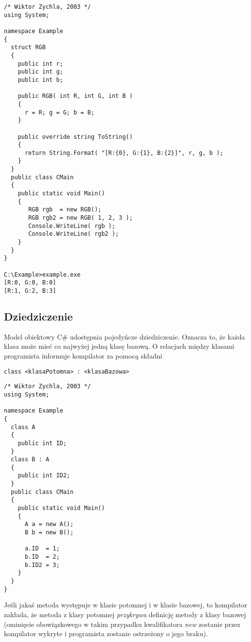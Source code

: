\begin{scriptsize}
\begin{verbatim}
/* Wiktor Zychla, 2003 */
using System;

namespace Example
{
  struct RGB
  {
    public int r;
    public int g;
    public int b;
    
    public RGB( int R, int G, int B )
    {
      r = R; g = G; b = B;
    }

    public override string ToString()
    {
      return String.Format( "[R:{0}, G:{1}, B:{2}]", r, g, b );
    }
  }
  public class CMain
  {    
    public static void Main()
    {
       RGB rgb  = new RGB(); 
       RGB rgb2 = new RGB( 1, 2, 3 );
       Console.WriteLine( rgb );
       Console.WriteLine( rgb2 );
    }
  }
}

C:\Example>example.exe
[R:0, G:0, B:0]
[R:1, G:2, B:3]
\end{verbatim}
\end{scriptsize}

\subsection{Dziedziczenie}

Model obiektowy C\# udostępnia pojedyńcze dziedziczenie. Oznacza to, że każda klasa może mieć co najwyżej
jedną klasę bazową. O relacjach między klasami programista informuje kompilator za pomocą składni

\begin{scriptsize}
\begin{verbatim}
class <klasaPotomna> : <klasaBazowa>
\end{verbatim}
\end{scriptsize}

\begin{scriptsize}
\begin{verbatim}
/* Wiktor Zychla, 2003 */
using System;

namespace Example
{
  class A
  {
    public int ID;
  }
  class B : A
  {
    public int ID2;
  }
  public class CMain
  {    
    public static void Main()
    {
      A a = new A();
      B b = new B();
      
      a.ID  = 1;
      b.ID  = 2;
      b.ID2 = 3;
    }
  }
}
\end{verbatim}
\end{scriptsize}

Jeśli jakaś metoda występuje w klasie potomnej i w klasie bazowej, to kompilator zakłada, że 
metoda z klasy potomnej {\em przykrywa} definicję metody z klasy bazowej (ominięcie obowiązkowego
w takim przypadku kwalifikatora {\em new} zostanie przez kompilator wykryte i programista zostanie ostrzeżony
o jego braku).

